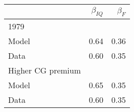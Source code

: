 \begin{tabular}{lrr}
\hline
  & $\beta_{IQ}$  & $\beta_{F}$  \\ 
\hline
1979 &   &   \\ 
Model & 0.64  & 0.36  \\ 
Data & 0.60  & 0.35  \\ 
Higher CG premium &   &   \\ 
Model & 0.65  & 0.35  \\ 
Data & 0.60  & 0.35  \\ 
\hline
\end{tabular}%
